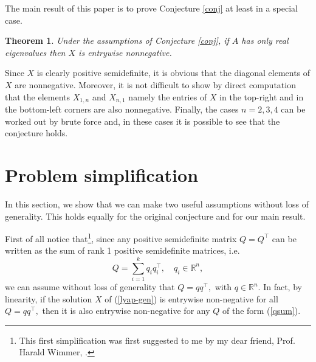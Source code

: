 \documentclass[10pt,a4paper]{amsart}
\def\R{\mathbb{R}}
\newcommand{\tp}{^{\top}}
\newcommand{\beq}{\begin{equation}}
\newcommand{\eeq}{\end{equation}}
\newtheorem{theorem}{Theorem}
\begin{document}
The main result of this paper is to prove Conjecture \ref{conj} at least in a special case.

\begin{theorem}\label{main-res}
Under the assumptions of Conjecture 
\ref{conj}, if $A$ has only real 
eigenvalues then $X$ is entrywise nonnegative.
\end{theorem}



\begin{remark}
Since $X$ is clearly positive semidefinite, it is obvious that the diagonal elements of $X$ are nonnegative.
Moreover, it is not difficult to show by direct computation that the elements $X_{1,n}$ and $X_{n,1}$ namely the entries of $X$ in the top-right and in the bottom-left corners are also nonnegative.
Finally, the cases $n=2,3,4$ can be worked out by brute force and, in these cases it is possible to see that the conjecture holds.
\end{remark}


\section{Problem simplification}

In this section, we show that we can make two useful assumptions without loss of generality.
This holds equally for the original conjecture and for our main result. 

First of all notice that\footnote{This first simplification was first suggested to me by my dear friend, Prof. Harald Wimmer, \cite{harald-pc}.}, since any positive semidefinite matrix $Q=Q\tp$ can be written as the sum of rank 1 positive semidefinite  matrices, i.e.
\beq\label{qsum}
Q=\sum_{i=1}^k q_iq_i\tp,\quad q_i\in\R^n,
\eeq
we can assume  without loss of
generality that $Q=qq\tp,$ with $q\in\R^n$. 
In fact, by linearity, if the solution $X$ of (\ref{lyap-gen}) is entrywise non-negative for all
$Q=qq\tp,$ then it is also  entrywise non-negative for any $Q$ of the form (\ref{qsum}).
\end{document}
